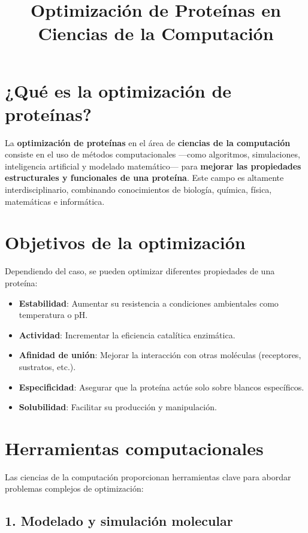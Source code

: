 \documentclass[12pt]{article}
\title{Optimización de Proteínas en Ciencias de la Computación}
\author{}
\date{}
\begin{document}
\maketitle

\section*{¿Qué es la optimización de proteínas?}

La \textbf{optimización de proteínas} en el área de \textbf{ciencias de la computación} consiste en el uso de métodos computacionales —como algoritmos, simulaciones, inteligencia artificial y modelado matemático— para \textbf{mejorar las propiedades estructurales y funcionales de una proteína}. Este campo es altamente interdisciplinario, combinando conocimientos de biología, química, física, matemáticas e informática.

\section*{Objetivos de la optimización}

Dependiendo del caso, se pueden optimizar diferentes propiedades de una proteína:

\begin{itemize}
    \item \textbf{Estabilidad}: Aumentar su resistencia a condiciones ambientales como temperatura o pH.
    \item \textbf{Actividad}: Incrementar la eficiencia catalítica enzimática.
    \item \textbf{Afinidad de unión}: Mejorar la interacción con otras moléculas (receptores, sustratos, etc.).
    \item \textbf{Especificidad}: Asegurar que la proteína actúe solo sobre blancos específicos.
    \item \textbf{Solubilidad}: Facilitar su producción y manipulación.
\end{itemize}

\section*{Herramientas computacionales}

Las ciencias de la computación proporcionan herramientas clave para abordar problemas complejos de optimización:

\subsection*{1. Modelado y simulación molecular}
\end{document}
